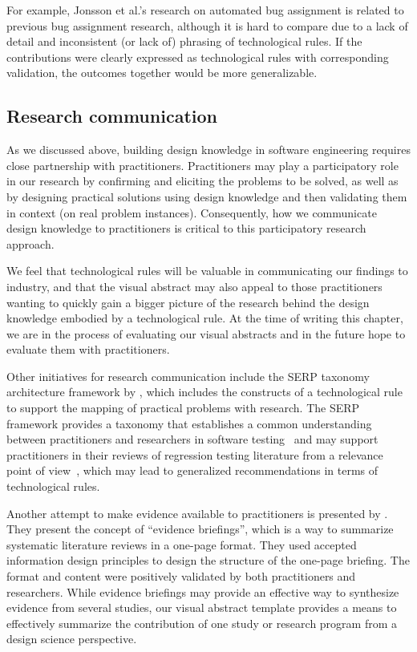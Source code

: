 \documentclass[graybox]{svmult}
\begin{document}
For example, Jonsson et al.'s research on automated bug assignment is related to previous bug assignment research, although it is hard to compare due to a lack of detail and inconsistent (or lack of) phrasing of technological rules. If the contributions were clearly expressed as technological rules with corresponding validation, the outcomes together would be more generalizable.



\subsection{Research communication}
\label{sec:communication}

As we discussed above, building design knowledge in software engineering requires close partnership with practitioners. 
Practitioners may play a participatory role in our research by confirming and eliciting the problems to be solved, as well as by designing practical solutions using design knowledge and then validating them in context (on real problem instances). 
Consequently, how we communicate design knowledge to practitioners is critical to this participatory research approach.

We feel that technological rules will be valuable in communicating our findings to industry, and that the visual abstract may also appeal to those practitioners wanting to quickly gain a bigger picture of the research behind the design knowledge embodied by a technological rule. 
At the time of writing this chapter, we are in the process of evaluating our visual abstracts and in the future hope to evaluate them with practitioners.


Other initiatives for research communication include the  SERP taxonomy architecture framework by \cite{petersen_finding_2014}, which includes the constructs of a technological rule  
to support the mapping of practical problems with research. 
The SERP framework provides a taxonomy that establishes a common understanding between practitioners and researchers in software testing~\citep{engstrom_SERP-test_2017} and may support practitioners in their reviews of regression testing literature from a relevance point of view~\citep{ali_search_2019}, which may lead to generalized recommendations in terms of technological rules. 

Another attempt to make evidence available to practitioners is presented by \cite{Cartaxo2016}. 
They present the concept of ``evidence briefings'', which is a way to summarize systematic literature reviews in a one-page format. 
They used accepted information design principles to design the structure of the one-page briefing. The format and content were positively validated by both practitioners and researchers. While evidence briefings may provide an effective way to synthesize evidence from several studies, our visual abstract template provides a means to effectively summarize the contribution of one study or research program from a design science perspective.
\end{document}
